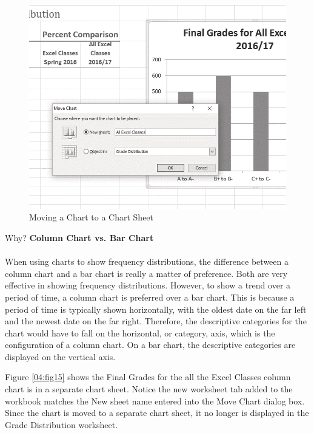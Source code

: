 \begin{figure}[H]
	\centering
	\includegraphics[width=\maxwidth{.95\linewidth}]{gfx/ch04_fig14}
	\caption{Moving a Chart to a Chart Sheet}
	\label{04:fig14}
\end{figure}

\begin{center}
	\begin{infobox}{Why?}
		\textbf{Column Chart vs. Bar Chart}
		\\
		\\
		When using charts to show frequency distributions, the difference between a column chart and a bar chart is really a matter of preference. Both are very effective in showing frequency distributions. However, to show a trend over a period of time, a column chart is preferred over a bar chart. This is because a period of time is typically shown horizontally, with the oldest date on the far left and the newest date on the far right. Therefore, the descriptive categories for the chart would have to fall on the horizontal, or category, axis, which is the configuration of a column chart. On a bar chart, the descriptive categories are displayed on the vertical axis.
	\end{infobox}
\end{center}

Figure \ref{04:fig15} shows the Final Grades for the all the Excel Classes column chart is in a separate chart sheet. Notice the new worksheet tab added to the workbook matches the New sheet name entered into the Move Chart dialog box. Since the chart is moved to a separate chart sheet, it no longer is displayed in the Grade Distribution worksheet.


